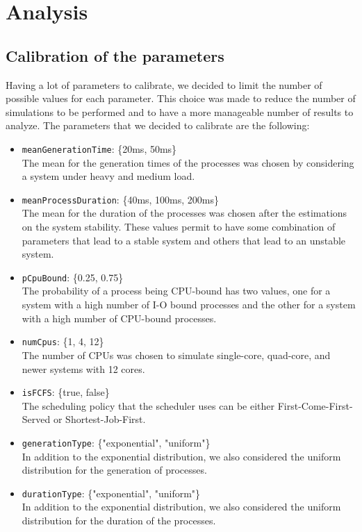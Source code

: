 \chapter{Analysis}

\section{Calibration of the parameters}

Having a lot of parameters to calibrate, we decided to limit the number of possible values for each parameter. This choice was made to reduce the number of simulations to be performed and to have a more manageable number of results to analyze. The parameters that we decided to calibrate are the following:

\begin{itemize}
    \item \texttt{meanGenerationTime}: \{20ms, 50ms\} \\
    The mean for the generation times of the processes was chosen by considering a system under heavy and medium load.
    \item \texttt{meanProcessDuration}: \{40ms, 100ms, 200ms\} \\
    The mean for the duration of the processes was chosen after the estimations on the system stability. These values permit to have some combination of parameters that lead to a stable system and others that lead to an unstable system.
    \item \texttt{pCpuBound}: \{0.25, 0.75\} \\
    The probability of a process being CPU-bound has two values, one for a system with a high number of I-O bound processes and the other for a system with a high number of CPU-bound processes.
    \item \texttt{numCpus}: \{1, 4, 12\} \\
    The number of CPUs was chosen to simulate single-core, quad-core, and newer systems with 12 cores.
    \item \texttt{isFCFS}: \{true, false\} \\
    The scheduling policy that the scheduler uses can be either First-Come-First-Served or Shortest-Job-First.
    \item \texttt{generationType}: \{"exponential", "uniform"\} \\
    In addition to the exponential distribution, we also considered the uniform distribution for the generation of processes.
    \item \texttt{durationType}: \{"exponential", "uniform"\} \\
    In addition to the exponential distribution, we also considered the uniform distribution for the duration of the processes.
\end{itemize}


